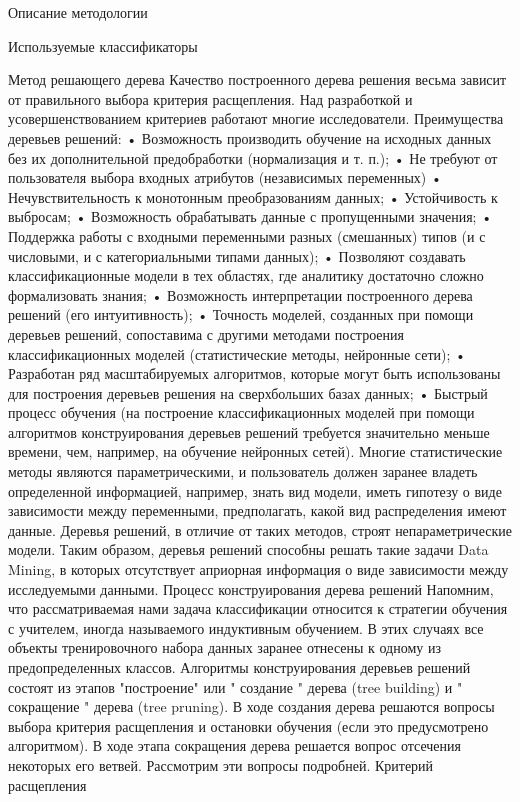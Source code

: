 \begin{section}{Описание методологии}
\begin{subsection}{Используемые классификаторы}
\begin{subsubsection}{Метод решающего дерева}
Качество построенного дерева решения весьма зависит от правильного выбора критерия расщепления. Над разработкой и усовершенствованием критериев работают многие исследователи.
Преимущества деревьев решений:
•	Возможность производить обучение на исходных данных без их дополнительной предобработки (нормализация и т. п.);
•	Не требуют от пользователя выбора входных атрибутов (независимых переменных)
•	Нечувствительность к монотонным преобразованиям данных;
•	Устойчивость к выбросам;
•	Возможность обрабатывать данные с пропущенными значения;
•	Поддержка работы с входными переменными разных (смешанных) типов (и с числовыми, и с категориальными типами данных);
•	Позволяют создавать классификационные модели в тех областях, где аналитику достаточно сложно формализовать знания;
•	Возможность интерпретации построенного дерева решений (его интуитивность);
•	Точность моделей, созданных при помощи деревьев решений, сопоставима с другими методами построения классификационных моделей (статистические методы, нейронные сети);
•	Разработан ряд масштабируемых алгоритмов, которые могут быть использованы для построения деревьев решения на сверхбольших базах данных;
•	Быстрый процесс обучения (на построение классификационных моделей при помощи алгоритмов конструирования деревьев решений требуется значительно меньше времени, чем, например, на обучение нейронных сетей).
Многие статистические методы являются параметрическими, и пользователь должен заранее владеть определенной информацией, например, знать вид модели, иметь гипотезу о виде зависимости между переменными, предполагать, какой вид распределения имеют данные. Деревья решений, в отличие от таких методов, строят непараметрические модели. Таким образом, деревья решений способны решать такие задачи Data Mining, в которых отсутствует априорная информация о виде зависимости между исследуемыми данными.
Процесс конструирования дерева решений
Напомним, что рассматриваемая нами задача классификации относится к стратегии обучения с учителем, иногда называемого индуктивным обучением. В этих случаях все объекты тренировочного набора данных заранее отнесены к одному из предопределенных классов.
Алгоритмы конструирования деревьев решений состоят из этапов "построение" или " создание " дерева (tree building) и " сокращение " дерева (tree pruning). В ходе создания дерева решаются вопросы выбора критерия расщепления и остановки обучения (если это предусмотрено алгоритмом). В ходе этапа сокращения дерева решается вопрос отсечения некоторых его ветвей.
Рассмотрим эти вопросы подробней.
Критерий расщепления

\end{subsubsection}
\end{subsection}
\end{section}
